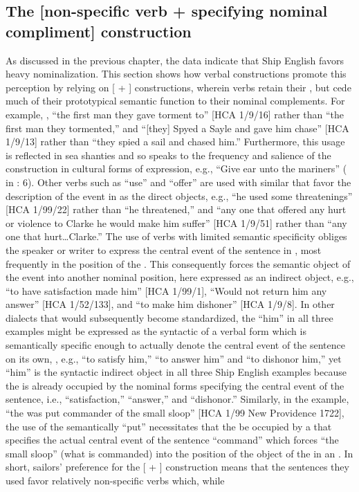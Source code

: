 \subsection{{The [non-specific verb + specifying nominal compliment] construction}}\label{sec:6.1.1}

As discussed in the previous chapter, the data indicate that Ship English favors heavy nominalization. This section shows how verbal constructions promote this perception by relying on [ + ] constructions, wherein verbs retain their , but cede much of their prototypical semantic function to their nominal complements.  For example, , “the first man they gave torment to” [HCA 1/9/16] rather than “the first man they tormented,” and “[they] Spyed a Sayle and gave him chase” [HCA 1/9/13] rather than “they spied a sail and chased him.” Furthermore, this usage is reflected in sea shanties and so speaks to the frequency and salience of the construction in cultural forms of expression, e.g., “Give ear unto the mariners” ( in \citealt{Hugill1969}: 6). Other verbs such as “use” and “offer” are used with similar  that favor the description of the event in  as the direct objects, e.g., “he used some threatenings” [HCA 1/99/22] rather than “he threatened,” and “any one that offered any hurt or violence to Clarke he would make him suffer” [HCA 1/9/51] rather than “any one that hurt…Clarke.” The use of verbs with limited semantic specificity obliges the speaker or writer to express the central event of the sentence in , most frequently in the position of the . This consequently forces the semantic object of the event into another nominal position, here expressed as an indirect object, e.g., “to have satisfaction made him” [HCA 1/99/1], “Would not return him any answer” [HCA 1/52/133], and “to make him dishoner” [HCA 1/9/8]. In other dialects that would subsequently become standardized, the  “him” in all three examples might be expressed as the syntactic  of a verbal form which is semantically specific enough to actually denote the central event of the sentence on its own, , e.g., “to satisfy him,” “to answer him” and “to dishonor him,” yet  “him” is the syntactic indirect object in all three Ship English examples because the  is already occupied by the nominal forms specifying the central event of the sentence, i.e., “satisfaction,” “answer,” and “dishonor.” Similarly, in the example, “the  was put commander of the small sloop” [HCA 1/99 New Providence 1722], the use of the semantically  “put” necessitates that the  be occupied by a  that specifies the actual central event of the sentence “command” which forces “the small sloop” (what is commanded) into the position of the object of the  in an . In short, sailors’ preference for the [ + ] construction means that the sentences they used favor relatively non-specific verbs which, while 